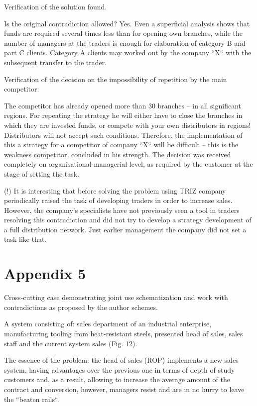 \documentclass[11pt,a4paper]{book}
\begin{document}
Verification of the solution found.

Is the original contradiction allowed? Yes. Even a superficial analysis shows
that funds are required several times less than for opening own branches,
while the number of managers at the traders is enough for elaboration of
category B and part C clients. Category A clients may worked out by the
company “X“ with the subsequent transfer to the trader.

Verification of the decision on the impossibility of repetition by the main
competitor:

The competitor has already opened more than 30 branches -- in all significant
regions. For repeating the strategy he will either have to close the branches
in which they are invested funds, or compete with your own distributors in
regions! Distributors will not accept such conditions. Therefore, the
implementation of this a strategy for a competitor of company “X“ will be
difficult -- this is the weakness competitor, concluded in his strength. The
decision was received completely on organisational-managerial level, as
required by the customer at the stage of setting the task.

(!) It is interesting that before solving the problem using TRIZ company
periodically raised the task of developing traders in order to increase sales.
However, the company's specialists have not previously seen a tool in traders
resolving this contradiction and did not try to develop a strategy development
of a full distribution network. Just earlier management the company did not
set a task like that.

\chapter{Appendix 5}

Cross-cutting case demonstrating joint use schematization and work with
contradictions as proposed by the author schemes.

A system consisting of: sales department of an industrial enterprise,
manufacturing tooling from heat-resistant steels, presented head of sales,
sales staff and the current system sales (Fig. 12).

The essence of the problem: the head of sales (ROP) implements a new sales
system, having advantages over the previous one in terms of depth of study
customers and, as a result, allowing to increase the average amount of the
contract and conversion, however, managers resist and are in no hurry to leave
the “beaten rails“.
\end{document}
